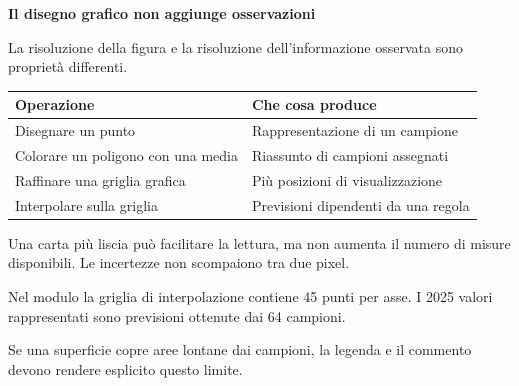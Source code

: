 \documentclass[12pt,aspectratio=1610]{beamer}
\newcommand{\PBody}[1]{\par{\fontsize{11.3}{14.8}\selectfont #1\par}}
\newcommand{\PSmall}[1]{\par{\fontsize{9.8}{13.1}\selectfont #1\par}}
\newcommand{\PInfo}[1]{%
\begin{tcolorbox}[enhanced,arc=1.6mm,boxrule=.55pt,colback=GeoTint,
 colframe=Rule!80!Classical,left=2.3mm,right=2.3mm,top=2mm,bottom=2mm,
 before skip=1mm,after skip=1mm]
\PSmall{#1}\end{tcolorbox}}
\begin{document}
\begin{frame}[plain]\hypertarget{slide42}{}
\begin{lrbox}{\TitleBox}
\begin{minipage}[t]{17.7cm}\raggedright\color{Ink}\fontsize{11.3}{14.8}\selectfont
\color{Navy}\bfseries\fontsize{20.6}{24.5}\selectfont Il disegno grafico non aggiunge osservazioni
\end{minipage}\end{lrbox}

\begin{lrbox}{\RecallBox}
\begin{minipage}[t]{14.3cm}\raggedright\color{Ink}\fontsize{11.3}{14.8}\selectfont
\fontsize{10.3}{13.8}\selectfont La risoluzione della figura e la risoluzione dell’informazione osservata sono proprietà differenti.
\end{minipage}\end{lrbox}

\begin{lrbox}{\PilotLeftBox}
\begin{minipage}[t]{10.05cm}\raggedright\color{Ink}\fontsize{11.3}{14.8}\selectfont
{\fontsize{10.2}{13.1}\selectfont\renewcommand{\arraystretch}{1.45}\begin{tabular}{@{}p{4.2cm}p{4.8cm}@{}}\toprule
\textbf{Operazione} & \textbf{Che cosa produce}\\\midrule
Disegnare un punto & Rappresentazione di un campione\\
Colorare un poligono con una media & Riassunto di campioni assegnati\\
Raffinare una griglia grafica & Più posizioni di visualizzazione\\
Interpolare sulla griglia & Previsioni dipendenti da una regola\\
\bottomrule\end{tabular}}

\end{minipage}\end{lrbox}

\begin{lrbox}{\PilotRightBox}
\begin{minipage}[t]{7.55cm}\raggedright\color{Ink}\fontsize{11.3}{14.8}\selectfont
\PBody{Una carta più liscia può facilitare la lettura, ma non aumenta il numero di misure disponibili. Le incertezze non scompaiono tra due pixel.}
\vspace{2.5mm}
\PInfo{Nel modulo la griglia di interpolazione contiene 45 punti per asse. I 2025 valori rappresentati sono previsioni ottenute dai 64 campioni.}
\PBody{Se una superficie copre aree lontane dai campioni, la legenda e il commento devono rendere esplicito questo limite.}
\vspace{2.5mm}


\end{minipage}
\end{lrbox}
\end{frame}
\end{document}
